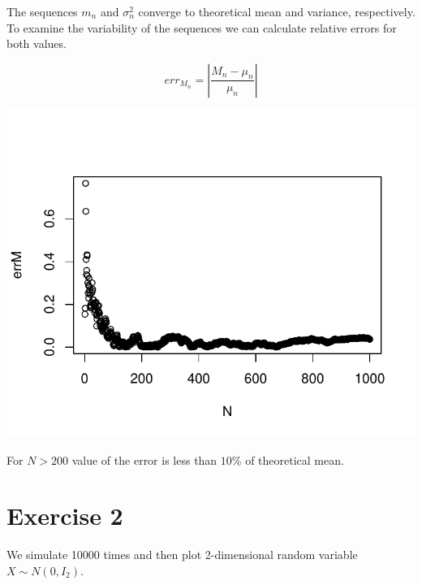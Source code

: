\documentclass[12pt, a4paper]{article}\usepackage[]{graphicx}\usepackage[]{color}
\makeatletter
\def\maxwidth{ %
  \ifdim\Gin@nat@width>\linewidth
    \linewidth
  \else
    \Gin@nat@width
  \fi
}
\newenvironment{knitrout}{}{} %
\makeatother
\begin{document}
The sequences $m_n$ and $\sigma_n^2$ converge to theoretical mean and variance, respectively. To examine the variability of the sequences we can calculate relative errors for both values.

\[ err_{M_n} = \left| \frac{M_n - \mu_n}{\mu_n}  \right| \]

\begin{knitrout}
\color{fgcolor}

{\centering \includegraphics[width=\maxwidth]{figure/ex1_2err-1} 

}



\end{knitrout}

For $N>200$ value of the error is less than $10\%$ of theoretical mean.
















\section{Exercise 2}

We simulate 10000 times and then plot 2-dimensional random variable $X\sim N(0,I_2)$.
\end{document}
